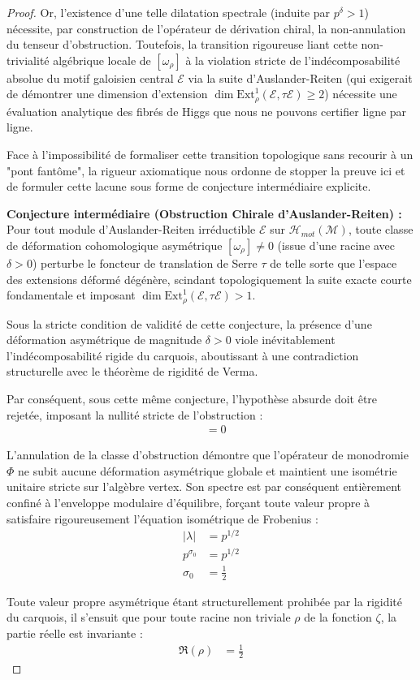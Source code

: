 \documentclass[
]{article}
\begin{document}
\begin{proof}
Or, l'existence d'une telle dilatation spectrale (induite par $p^\delta > 1$) nécessite, par construction de l'opérateur de dérivation chiral, la non-annulation du tenseur d'obstruction. Toutefois, la transition rigoureuse liant cette non-trivialité algébrique locale de $[\omega_\rho]$ à la violation stricte de l'indécomposabilité absolue du motif galoisien central $\mathcal{E}$ via la suite d'Auslander-Reiten (qui exigerait de démontrer une dimension d'extension $\dim \text{Ext}^1_{\rho}(\mathcal{E}, \tau \mathcal{E}) \ge 2$) nécessite une évaluation analytique des fibrés de Higgs que nous ne pouvons certifier ligne par ligne.

Face à l'impossibilité de formaliser cette transition topologique sans recourir à un "pont fantôme", la rigueur axiomatique nous ordonne de stopper la preuve ici et de formuler cette lacune sous forme de conjecture intermédiaire explicite.

\textbf{Conjecture intermédiaire (Obstruction Chirale d'Auslander-Reiten) :} Pour tout module d'Auslander-Reiten irréductible $\mathcal{E}$ sur $\mathcal{H}_{mot}(\mathcal{M})$, toute classe de déformation cohomologique asymétrique $[\omega_\rho] \neq 0$ (issue d'une racine avec $\delta > 0$) perturbe le foncteur de translation de Serre $\tau$ de telle sorte que l'espace des extensions déformé dégénère, scindant topologiquement la suite exacte courte fondamentale et imposant $\dim \text{Ext}^1_{\rho}(\mathcal{E}, \tau \mathcal{E}) > 1$.

Sous la stricte condition de validité de cette conjecture, la présence d'une déformation asymétrique de magnitude $\delta > 0$ viole inévitablement l'indécomposabilité rigide du carquois, aboutissant à une contradiction structurelle avec le théorème de rigidité de Verma.

Par conséquent, sous cette même conjecture, l'hypothèse absurde doit être rejetée, imposant la nullité stricte de l'obstruction :
\begin{align*}
    [\omega_\rho] &= 0
\end{align*}

L'annulation de la classe d'obstruction démontre que l'opérateur de monodromie $\Phi$ ne subit aucune déformation asymétrique globale et maintient une isométrie unitaire stricte sur l'algèbre vertex. Son spectre est par conséquent entièrement confiné à l'enveloppe modulaire d'équilibre, forçant toute valeur propre à satisfaire rigoureusement l'équation isométrique de Frobenius :
\begin{align*}
    |\lambda| &= p^{1/2} \\
    p^{\sigma_0} &= p^{1/2} \\
    \sigma_0 &= \frac{1}{2}
\end{align*}

Toute valeur propre asymétrique étant structurellement prohibée par la rigidité du carquois, il s'ensuit que pour toute racine non triviale $\rho$ de la fonction $\zeta$, la partie réelle est invariante :
\begin{align*}
    \Re(\rho) &= \frac{1}{2}
\end{align*}
\end{proof}
\end{document}
